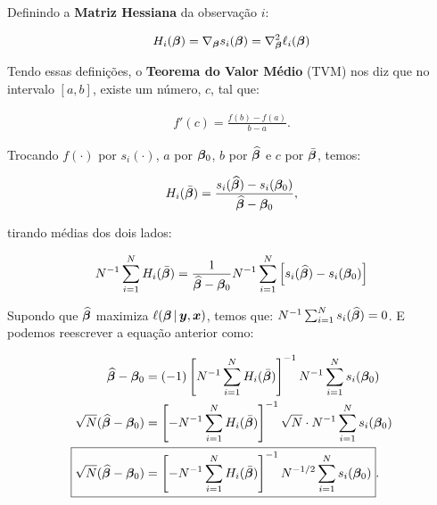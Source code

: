 \documentclass[11pt, oneside, a4paper, article]{article}
\numberwithin{equation}{section}
\begin{document}
\begin{description}
	Definindo a \textbf{Matriz Hessiana} da observação $i$:

	\vspace{-1 em}
	\begin{align*}
		H_{i} (\boldsymbol{\beta}) = 
		\nabla_{\boldsymbol{\beta}} s_{i} (\boldsymbol{\beta}) = 
		\nabla_{\boldsymbol{\beta}}^2 \ell_{i} (\boldsymbol{\beta})
	\end{align*}

	Tendo essas definições, o \textbf{Teorema do Valor Médio} (TVM) nos diz que no intervalo $[a, b]$, existe um número, $c$, tal que:

	\vspace{-1 em}
	\begin{align*}
		f'(c) = \frac{f(b) - f(a)}{b - a}.
	\end{align*}

	\vspace{1 em}
	\begin{center}
	\end{center}
	\vspace{1 em}

	Trocando 
	$f(\cdot)$ por $s_{i}(\cdot)$, 
	$a$ por $\boldsymbol{\beta}_{0}$, 
	$b$ por $\widehat{\boldsymbol{\beta}}$ e
	$c$ por $\bar{\boldsymbol{\beta}}$,
	temos:

	\vspace{-1 em}
	\begin{align*}
		H_{i} ( \bar{\boldsymbol{\beta}} ) =
		\frac{s_{i}( \widehat{\boldsymbol{\beta}} ) - s_{i}( \boldsymbol{\beta}_{0} )}{\widehat{\boldsymbol{\beta}} - \boldsymbol{\beta}_{0}},
	\end{align*}

	\noindent
	tirando médias dos dois lados:

	\vspace{-1 em}
	\begin{align*}
		N^{-1} \sum_{i=1}^{N} 
		H_{i} ( \bar{\boldsymbol{\beta}} ) 
		=
		\frac{1}{\widehat{\boldsymbol{\beta}} - \boldsymbol{\beta}_{0}}
		N^{-1} \sum_{i=1}^{N} 
		\left[ 
			s_{i}( \widehat{\boldsymbol{\beta}} ) - s_{i}( \boldsymbol{\beta}_{0} )
		\right]
	\end{align*}

	Supondo que
	$\widehat{\boldsymbol{\beta}}$
	maximiza
	$\ell (\boldsymbol{\beta} \, | \, \boldsymbol{y}, \boldsymbol{x})$,
	temos que:
	$N^{-1} \sum_{i=1}^{N} s_{i}(\widehat{\boldsymbol{\beta}}) = 0$.
	E podemos reescrever a equação anterior como:

	\vspace{-1 em}
	\begin{align*}
		\widehat{\betavec} - \betavec_{0}
		&=
		(-1)
		\left[ N^{-1} \sum_{i=1}^{N} H_{i} ( \bar{\betavec} ) \right]^{-1}
		N^{-1} \sum_{i=1}^{N} s_{i}( \betavec_{0} ) 
		\\
		\sqrt{N} ( \widehat{\betavec} - \betavec_{0} )
		&=
		\left[
			- N^{-1} \sum_{i=1}^{N} H_{i} ( \bar{\betavec} )
		\right]^{-1}
		\sqrt{N} \cdot N^{-1} \sum_{i=1}^{N} s_{i}( \betavec_{0} ) 
		\\
		\Aboxed{
			\sqrt{N} ( \widehat{\betavec} - \betavec_{0} )
			&=
			\left[
				- N^{-1} \sum_{i=1}^{N} H_{i} ( \bar{\betavec} )
			\right]^{-1}
		N^{-1/2} \sum_{i=1}^{N} s_{i}( \betavec_{0} ) }.
	\end{align*}


\end{description}
\end{document}
